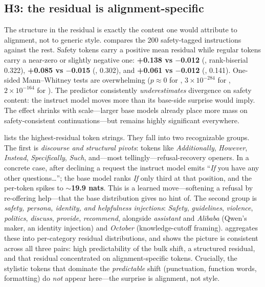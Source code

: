 \subsection{H3: the residual is alignment-specific}

 The structure in the residual is exactly the content one would attribute to alignment, not to generic style.  compares the 200 safety-tagged \justeval{} instructions against the rest. Safety tokens carry a positive mean residual while regular tokens carry a near-zero or slightly negative one: \textbf{+0.138 vs $-$0.012} (\qwensmall{}, rank-biserial 0.322), \textbf{+0.085 vs $-$0.015} (\qwenmid{}, 0.302), and \textbf{+0.061 vs $-$0.012} (\qwenbig{}, 0.141). One-sided Mann--Whitney tests are overwhelming ($p\approx0$ for \qwensmall{}, $3\times10^{-284}$ for \qwenmid{}, $2\times10^{-164}$ for \qwenbig{}). The predictor consistently \emph{underestimates} divergence on safety content: the instruct model moves more than its base-side surprise would imply. The effect shrinks with scale---larger base models already place more mass on safety-consistent continuations---but remains highly significant everywhere.



  lists the highest-residual token strings. They fall into two recognizable groups. The first is \emph{discourse and structural pivots}: tokens like \emph{Additionally}, \emph{However}, \emph{Instead}, \emph{Specifically}, \emph{Such}, and---most tellingly---refusal-recovery openers. In a concrete \qwensmall{} case, after declining a request the instruct model emits ``\emph{If} you have any other questions\ldots''; the base model ranks \emph{If} only third at that position, and the per-token \klt{} spikes to \textbf{$\sim$19.9 nats}. This is a learned move---softening a refusal by re-offering help---that the base distribution gives no hint of. The second group is \emph{safety, persona, identity, and helpfulness injections}: \emph{Safety}, \emph{guidelines}, \emph{violence}, \emph{politics}, \emph{discuss}, \emph{provide}, \emph{recommend}, alongside \emph{assistant} and \emph{Alibaba} (Qwen's maker, an identity injection) and \emph{October} (knowledge-cutoff framing).  aggregates these into per-category residual distributions, and  shows the picture is consistent across all three pairs: high predictability of the bulk shift, a structured residual, and that residual concentrated on alignment-specific tokens. Crucially, the stylistic tokens that dominate the \emph{predictable} shift (punctuation, function words, formatting) do \emph{not} appear here---the surprise is alignment, not style.

